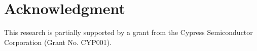 \section{Acknowledgment}
This research is partially supported by a grant from the Cypress Semiconductor Corporation (Grant No. CYP001).